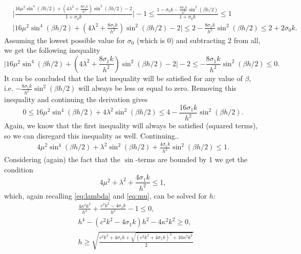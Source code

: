 \documentclass{article}
\begin{document}
\begin{equation}\nonumber
    \begin{aligned}
        &\Bigg|\frac{16\mu^2\sin^4(\beta h/2)+(4\lambda^2+\frac{8\sigma_1k}{h^2})\sin^2(\beta h/2) - 2}{1+\sigma_0k}\Bigg|-1 \leq \frac{1-\sigma_0k-\frac{8\sigma_1k}{h^2}\sin^2(\beta h/2)}{1+\sigma_0k}\leq 1\\
        &\Big|16\mu^2\sin^4(\beta h/2)+(4\lambda^2+\frac{8\sigma_1k}{h^2})\sin^2(\beta h/2) - 2\Big|\leq2-\frac{8\sigma_1k}{h^2}\sin^2(\beta h/2)\leq2+2\sigma_0k.
    \end{aligned}
\end{equation}
Assuming the lowest possible value for $\sigma_0$ (which is 0) and subtracting 2 from all, we get the following inequality
\begin{equation}
        \Big|16\mu^2\sin^4(\beta h/2)+(4\lambda^2+\frac{8\sigma_1k}{h^2})\sin^2(\beta h/2) - 2\Big|-2\leq-\frac{8\sigma_1k}{h^2}\sin^2(\beta h/2)\leq0.
\end{equation}
It can be concluded that the last inequality will be satisfied for any value of $\beta$, i.e. $-\frac{8\sigma_1k}{h^2}\sin^2(\beta h/2)$ will always be less or equal to zero. Removing this inequality and continuing the derivation gives
\begin{equation}
    0 \leq 16\mu^2\sin^4(\beta h/2) + 4\lambda^2\sin^2(\beta h/2) \leq 4-\frac{16\sigma_1k}{h^2}\sin^2(\beta h/2).
\end{equation}
Again, we know that the first inequality will always be satisfied (squared terms), so we can disregard this inequality as well. Continuing..
\begin{equation}
    \begin{aligned}
        4\mu^2\sin^4(\beta h/2) + \lambda^2\sin^2(\beta h/2)+\frac{4\sigma_1k}{h^2}\sin^2(\beta h/2) \leq 1.
    \end{aligned}
\end{equation}
Considering (again) the fact that the $\sin$-terms are bounded by 1 we get the condition
\begin{equation}
    4\mu^2 + \lambda^2 + \frac{4\sigma_1k}{h^2} \leq 1,
\end{equation}
which, again recalling \eqref{eq:lambda} and \eqref{eq:mu}, can be solved for $h$:
\begin{equation}
    \begin{aligned}
        &\frac{4\kappa^2k^2}{h^4}+\frac{c^2k^2-4\sigma_1k}{h^2} - 1 \leq 0,\\
        &h^4 - (c^2k^2-4\sigma_1k)h^2 - 4\kappa^2k^2 \geq 0,\\
        &h\geq\sqrt{\frac{c^2k^2+4\sigma_1k+\sqrt{(c^2k^2+4\sigma_1k)^2+16\kappa^2k^2}}{2}}
    \end{aligned}
\end{equation}


\end{document}
